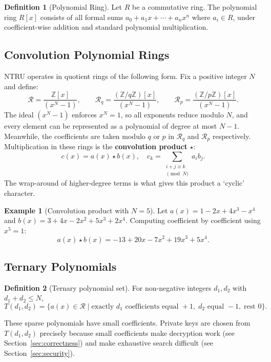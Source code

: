 \documentclass[12pt, a4paper]{article}
\theoremstyle{definition}
\newtheorem{definition}{Definition}[section]
\newtheorem{example}{Example}[section]
\theoremstyle{plain}
\newcommand{\Z}{\mathbb{Z}}
\newcommand{\R}{\mathcal{R}}
\begin{document}
\begin{definition}[Polynomial Ring]
    Let $R$ be a commutative ring. The polynomial ring $R[x]$ consists of all formal sums $a_0 + a_1 x + \cdots + a_n x^n$ where $a_i \in R$, under coefficient-wise addition and standard polynomial multiplication.
\end{definition}

\subsection{Convolution Polynomial Rings}

NTRU operates in quotient rings of the following form. Fix a positive integer $N$ and define:
\[
    \R = \frac{\Z[x]}{(x^N - 1)}, \qquad
    \R_q = \frac{(\Z/q\Z)[x]}{(x^N - 1)}, \qquad
    \R_p = \frac{(\Z/p\Z)[x]}{(x^N - 1)}.
\]
The ideal $(x^N - 1)$ enforces $x^N = 1$, so all exponents reduce modulo $N$, and every element can be represented as a polynomial of degree at most $N-1$. Meanwhile, the coefficients are taken modulo $q$ or $p$ in $\R_q$ and $\R_p$ respectively.\\

Multiplication in these rings is the \textbf{convolution product} $\star$:
\[
    c(x) = a(x) \star b(x), \quad c_k = \sum_{\substack{i+j \equiv k \\ \pmod{N}}} a_i b_j.
\]
The wrap-around of higher-degree terms is what gives this product a `cyclic' character.

\begin{example}[Convolution product with $N = 5$]
    Let $a(x) = 1 - 2x + 4x^3 - x^4$ and $b(x) = 3 + 4x - 2x^2 + 5x^3 + 2x^4$.
    Computing coefficient by coefficient using $x^5 = 1$:
    \[
        a(x) \star b(x) = -13 + 20x - 7x^2 + 19x^3 + 5x^4.
    \]
\end{example}

\subsection{Ternary Polynomials}

\begin{definition}[Ternary polynomial set]
    For non-negative integers $d_1, d_2$ with $d_1 + d_2 \le N$,
    \[
        T(d_1, d_2) = \bigl\{ a(x) \in \R \mid
            \text{exactly } d_1 \text{ coefficients equal } +1,\;
            d_2 \text{ equal } -1,\; \text{rest } 0 \bigr\}.
    \]
\end{definition}

These sparse polynomials have small coefficients. Private keys are chosen from $T(d_1, d_2)$ precisely because small coefficients make decryption work (see Section~\ref{sec:correctness}) and make exhaustive search difficult (see Section~\ref{sec:security}).
\end{document}
